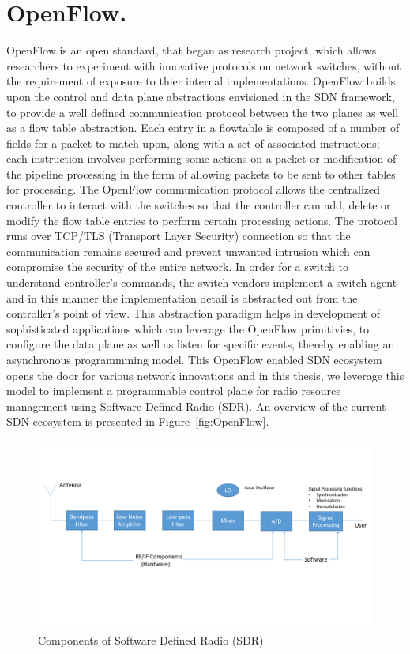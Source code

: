 \section{OpenFlow.}
OpenFlow is an open standard, that began as research project, which allows researchers to experiment with innovative protocols on network switches, without the requirement of exposure to thier internal implementations. OpenFlow\cite{openflow} builds upon the control and data plane abstractions envisioned in the SDN framework, to provide a well defined communication protocol between the two planes as well as a flow table abstraction. Each entry in a flowtable is composed of a number of fields for a packet to match upon, along with a set of associated instructions; each instruction involves performing some actions on a packet or modification of the pipeline processing in the form of allowing packets to be sent to other tables for processing. The OpenFlow communication protocol allows the centralized controller to interact with the switches so that the controller can add, delete or modify the flow table entries to perform certain processing actions. The protocol runs over TCP/TLS (Transport Layer Security) connection so that the communication remains secured and prevent unwanted intrusion which can compromise the security of the entire network. In order for a switch to understand controller's commands, the switch vendors implement a switch agent and in this manner the implementation detail is abstracted out from the controller's point of view. This abstraction paradigm helps in development of sophisticated applications which can leverage the OpenFlow primitivies, to configure the data plane as well as listen for specific events, thereby enabling an asynchronous programmming model. This OpenFlow enabled SDN ecosystem opens the door for various network innovations and in this thesis, we leverage this model to implement a programmable control plane for radio resource management using Software Defined Radio (SDR). An overview of the current SDN ecosystem is presented in Figure~\ref{fig:OpenFlow}.     


\begin{figure}[t]
  \centering
  \includegraphics[width=1\textwidth]{figures/SDR.pdf}
  \caption{Components of Software Defined Radio (SDR)}
  \label{fig:SDR}
\end{figure}
